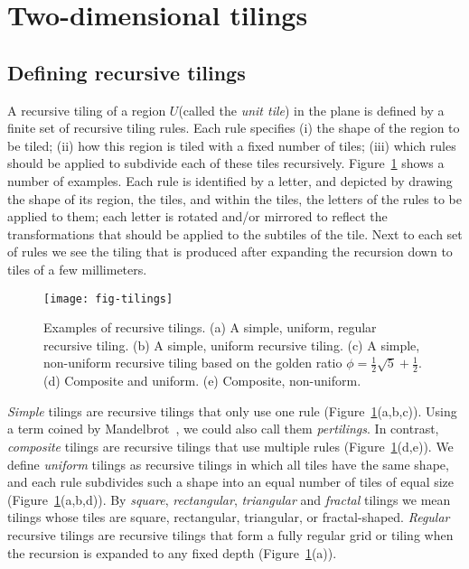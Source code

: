 \documentclass[11pt,a4paper]{article}
\newcommand{\unittile}{\ensuremath{U}\xspace}
\begin{document}
\section{Two-dimensional tilings}

\subsection{Defining recursive tilings}
A recursive tiling of a region \unittile (called the \emph{unit tile}) in the plane is defined by a finite set of recursive tiling rules. Each rule specifies (i) the shape of the region to be tiled; (ii) how this region is tiled with a fixed number of tiles; (iii) which rules should be applied to subdivide each of these tiles recursively. Figure~\ref{fig:tilings} shows a number of examples. Each rule is identified by a letter, and depicted by drawing the shape of its region, the tiles, and within the tiles, the letters of the rules to be applied to them; each letter is rotated and/or mirrored to reflect the transformations that should be applied to the subtiles of the tile. Next to each set of rules we see the tiling that is produced after expanding the recursion down to tiles of a few millimeters.

\begin{figure}
\centering
\texttt{[image: fig-tilings]}
\caption{Examples of recursive tilings. (a) A simple, uniform, regular recursive tiling. (b) A simple, uniform recursive tiling. (c) A simple, non-uniform recursive tiling based on the golden ratio $\phi = \frac12 \sqrt{5} + \frac12$. (d) Composite and uniform. (e) Composite, non-uniform.}
\label{fig:tilings}
\end{figure}

\emph{Simple} tilings are recursive tilings that only use one rule (Figure~\ref{fig:tilings}(a,b,c)). Using a term coined by Mandelbrot~\cite{Mandelbrot1983}, we could also call them \emph{pertilings}. In contrast, \emph{composite} tilings are recursive tilings that use multiple rules (Figure~\ref{fig:tilings}(d,e)).
We define \emph{uniform} tilings as recursive tilings in which all tiles have the same shape, and each rule subdivides such a shape into an equal number of tiles of equal size (Figure~\ref{fig:tilings}(a,b,d)).
By \emph{square}, \emph{rectangular}, \emph{triangular} and \emph{fractal} tilings we mean tilings whose tiles are square, rectangular, triangular, or fractal-shaped.
\emph{Regular} recursive tilings are recursive tilings that form a fully regular grid or tiling when the recursion is expanded to any fixed depth (Figure~\ref{fig:tilings}(a)).
\end{document}
